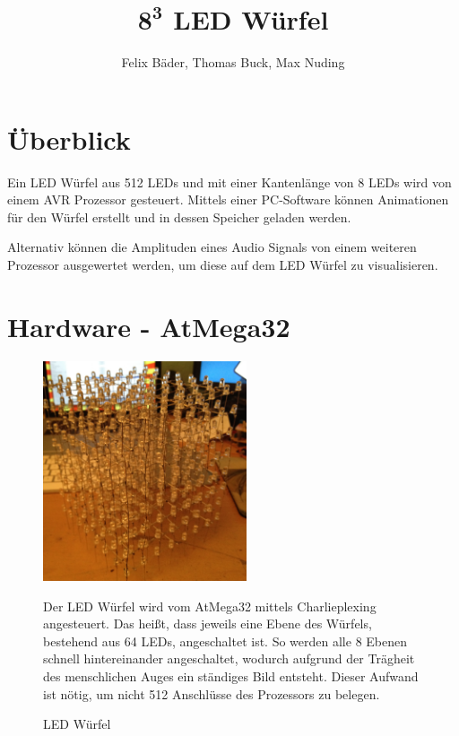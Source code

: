 \documentclass[11pt]{amsart}
\title{\(\boldsymbol{8^3}\) LED Würfel}
\author{Felix Bäder, Thomas Buck, Max Nuding}
\date{}                                           %
\begin{document}
\maketitle


\section{Überblick}

Ein LED Würfel aus 512 LEDs und mit einer Kantenlänge von 8 LEDs wird von einem AVR Prozessor gesteuert. Mittels einer PC-Software können Animationen für den Würfel erstellt und in dessen Speicher geladen werden.

Alternativ können die Amplituden eines Audio Signals von einem weiteren Prozessor ausgewertet werden, um diese auf dem LED Würfel zu visualisieren.


\section{Hardware - AtMega32}
\begin{figure}[hbp]
	\begin{minipage}[t]{6cm}
		\vspace{0pt}
		\centering
		\includegraphics[width=6cm]{cube.jpg}
		\caption{LED Würfel}
		\label{Cube}
	\end{minipage}
	\hfill
	\begin{minipage}[t]{7cm}
		\vspace{0pt}
		Der LED Würfel wird vom AtMega32 mittels Charlieplexing angesteuert. Das heißt, dass jeweils eine Ebene des Würfels, bestehend aus 64 LEDs, angeschaltet ist. So werden alle 8 Ebenen schnell hintereinander angeschaltet, wodurch aufgrund der Trägheit des menschlichen Auges ein ständiges Bild entsteht. Dieser Aufwand ist nötig, um nicht 512 Anschlüsse des Prozessors zu belegen.
	\end{minipage}
\end{figure}
\end{document}

